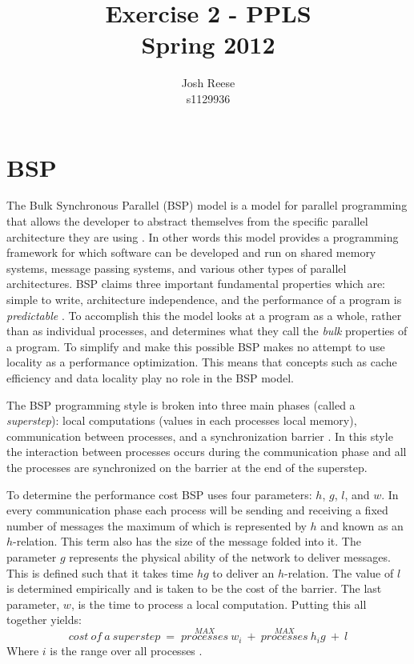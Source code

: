 \documentclass[10pt]{report}
\begin{document}
\title{Exercise 2 - PPLS\\Spring 2012}
\author{Josh Reese\\s1129936}
\maketitle
\section{BSP}
The Bulk Synchronous Parallel (BSP) model is a model for parallel
programming that allows the developer to abstract themselves from the
specific parallel architecture they are using \cite{bsp}. In other words this
model provides a programming framework for which software can be
developed and run on shared memory systems, message passing systems,
and various other types of parallel architectures. BSP claims three
important fundamental properties which are: simple to write,
architecture independence, and the performance of a program is
\emph{predictable} \cite{bsp}. To accomplish this the model looks at a program
as a whole, rather than as individual processes, and determines what they
call the \emph{bulk} properties of a program. To simplify and make
this possible BSP makes no attempt to use locality as a performance
optimization. This means that concepts such as cache efficiency and data
locality play no role in the BSP model.

The BSP programming style is broken into three main phases (called a
\emph{superstep}): local
computations (values in each processes local memory), communication
between processes, and a synchronization barrier \cite{bsp}. In this style the
interaction between processes occurs during the communication phase
and all the processes are synchronized on the barrier at the end of
the superstep.

To determine the performance cost BSP uses four parameters: $h$,
$g$, $l$, and $w$. In every communication phase each process will be
sending and receiving a fixed number of messages the maximum of which
is represented by $h$ and known as an $h$-relation. This term also has
the size of the message folded into it. The parameter $g$
represents the physical ability of the network to deliver messages.
This is defined such that it takes time $hg$ to deliver an
$h$-relation. The value of $l$ is determined empirically and is taken
to be the cost of the barrier. The last parameter, $w$, is the time to
process a local computation. Putting this all together yields:\\
\[ cost\: of\: a\: superstep\: =\; \stackrel{MAX}{processes}\: w_{i}\: +\:
\stackrel{MAX}{processes}\:h_{i}g\: +\: l\]
Where $i$ is the range over all processes \cite{bsp}.
\end{document}

